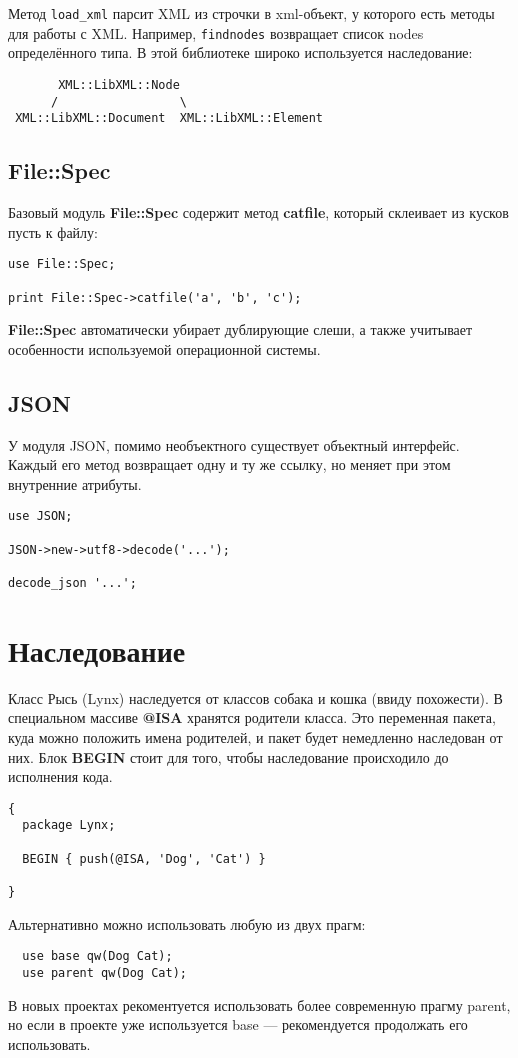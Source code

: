Метод \verb|load_xml| парсит XML из строчки в xml-объект, у которого есть методы для работы с XML. Например, \verb|findnodes| возвращает список nodes определённого типа. В этой библиотеке широко используется наследование:
\begin{verbatim}
       XML::LibXML::Node
      /                 \
 XML::LibXML::Document  XML::LibXML::Element
\end{verbatim}

\subsection{File::Spec}%
Базовый модуль \textbf{File::Spec} содержит метод \textbf{catfile}, который склеивает из кусков пусть к файлу:
\begin{verbatim}
use File::Spec;

print File::Spec->catfile('a', 'b', 'c');
\end{verbatim}
\textbf{File::Spec} автоматически убирает дублирующие слеши, а также учитывает особенности используемой операционной системы.

\subsection{JSON} %
У модуля JSON, помимо необъектного существует объектный интерфейс.
Каждый его метод возвращает одну и ту же ссылку, но меняет при этом внутренние атрибуты.
\begin{verbatim}
use JSON;

JSON->new->utf8->decode('...');

decode_json '...';
\end{verbatim}


\section{Наследование}%
Класс Рысь (Lynx) наследуется от классов собака и кошка (ввиду похожести). В специальном массиве \textbf{@ISA} хранятся родители класса. Это переменная пакета, куда можно положить имена родителей, и пакет будет немедленно наследован от них. Блок \textbf{BEGIN} стоит для того, чтобы наследование происходило до исполнения кода.
\begin{verbatim}
{
  package Lynx;

  BEGIN { push(@ISA, 'Dog', 'Cat') }

}
\end{verbatim}
Альтернативно можно использовать любую из двух прагм:
\begin{verbatim}
  use base qw(Dog Cat);
  use parent qw(Dog Cat);
\end{verbatim}
В новых проектах рекоментуется использовать более современную прагму parent, но если в проекте уже используется base --- рекомендуется продолжать его использовать.

